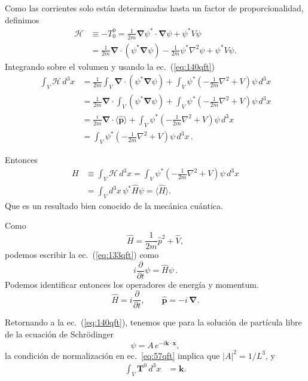 Como las corrientes solo están determinadas hasta un factor de proporcionalidad, definimos
\begin{align}
  \label{eq:139qft}
   \mathcal{H}&\equiv-T^0_0=\frac{1}{2m}\boldsymbol{\nabla}\psi^*\cdot\boldsymbol{\nabla}\psi+\psi^*V\psi\nonumber\\
   &=\frac{1}{2m}\boldsymbol{\nabla}\cdot(\psi^*\boldsymbol{\nabla}\psi)-\frac{1}{2m}\psi^*\nabla^2\psi+\psi^*V\psi.
\end{align}
Integrando sobre el volumen y usando la ec.~(\ref{eq:140qft})
\begin{align}
 \int_V\mathcal{H}\,d^3x&=\frac{1}{2m}\int_V\boldsymbol{\nabla}\cdot(\psi^*\boldsymbol{\nabla}\psi)
+\int_V\psi^*\left(-\frac{1}{2m}\nabla^2+V\right)\psi\,d^3x\nonumber\\
&=\frac{1}{2m}\boldsymbol{\nabla}\cdot\int_V(\psi^*\boldsymbol{\nabla}\psi)
+\int_V\psi^*\left(-\frac{1}{2m}\nabla^2+V\right)\psi\,d^3x\nonumber\\
&=\frac{i}{2m}\boldsymbol{\nabla}\cdot\langle\widehat{\mathbf{p}}\rangle
+\int_V\psi^*\left(-\frac{1}{2m}\nabla^2+V\right)\psi\,d^3x\nonumber\\
&=\int_V\psi^*\left(-\frac{1}{2m}\nabla^2+V\right)\psi\,d^3x\,.
\end{align}

Entonces
\begin{align}
\label{eq:141qft}
H&\equiv \int_V\mathcal{H}\,d^3x=\int_V\psi^*\left(-\frac{1}{2m}\nabla^2+V\right)\psi\,d^3x\nonumber\\
&=\int_{V} d^3x\,\psi^*\widehat{H}\psi=\langle\widehat{H}\rangle.
\end{align}
Que es un resultado bien conocido de la mecánica cuántica.

Como
\begin{equation}
  \widehat H=\frac{1}{2m}\hat p^2+\widehat V,
\end{equation}
podemos escribir la ec.~(\ref{eq:133qft}) como
\begin{equation}
  i\frac{\partial}{\partial t}\psi=\widehat H \psi\,.
\end{equation}
Podemos identificar entonces los operadores de energía y momentum.
\begin{equation}
  \label{eq:151qft}
  \widehat H=i\frac{\partial}{\partial t},\qquad \hat{\mathbf{p}}=-i\,\boldsymbol{\nabla}.
\end{equation}

Retornando a la ec.~(\ref{eq:140qft}), tenemos que para la solución de partícula libre de la ecuación de Schrödinger 
\begin{equation}
  \psi=A\,e^{-i\mathbf{k}\cdot\mathbf{x}},
\end{equation}
la condición de normalización en ec.~\eqref{eq:57qft} implica que $|A|^2=1/L^3$, y
\begin{align}
  \int_V \mathbf{T}^0\, d^3x&=\mathbf{k}.
\end{align}

